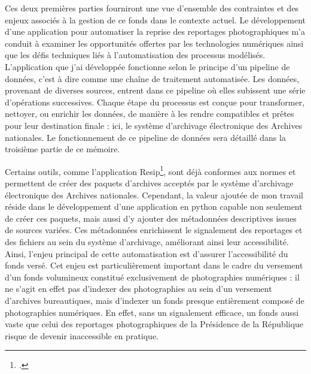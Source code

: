 Ces deux premières parties fourniront une vue d'ensemble des contraintes et des enjeux associés à la gestion de ce fonds dans le contexte actuel. Le développement d'une application pour automatiser la reprise des reportages photographiques m'a conduit à examiner les opportunités offertes par les technologies numériques ainsi que les défis techniques liés à l'automatisation des processus modélisés. L'application que j'ai développée fonctionne selon le principe d'un pipeline de données, c'est à dire comme une chaîne de traitement automatisée. Les données, provenant de diverses sources, entrent dans ce pipeline où elles subissent une série d'opérations successives. Chaque étape du processus est conçue pour transformer, nettoyer, ou enrichir les données, de manière à les rendre compatibles et prêtes pour leur destination finale : ici, le système d'archivage électronique des Archives nationales. Le fonctionnement de ce pipeline de données sera détaillé dans la troisième partie de ce mémoire.

Certains outils, comme l'application Resip\footcite{resip}, sont déjà conformes aux normes et permettent de créer des paquets d'archives acceptés par le système d'archivage électronique des Archives nationales. Cependant, la valeur ajoutée de mon travail réside dans le développement d'une application en \gls{python} capable non seulement de créer ces paquets, mais aussi d'y ajouter des métadonnées descriptives issues de sources variées. Ces métadonnées enrichissent le signalement des reportages et des fichiers au sein du système d'archivage, améliorant ainsi leur accessibilité. Ainsi, l'enjeu principal de cette automatisation est d'assurer l'accessibilité du fonds versé. Cet enjeu est particulièrement important dans le cadre du versement d'un fonds volumineux constitué exclusivement de photographies numériques : il ne s'agit en effet pas d'indexer des photographies au sein d'un versement d'archives bureautiques, mais d'indexer un fonds presque entièrement composé de photographies numériques. En effet, sans un  signalement efficace, un fonds aussi vaste que celui des reportages photographiques de la Présidence de la République risque de devenir inaccessible en pratique.